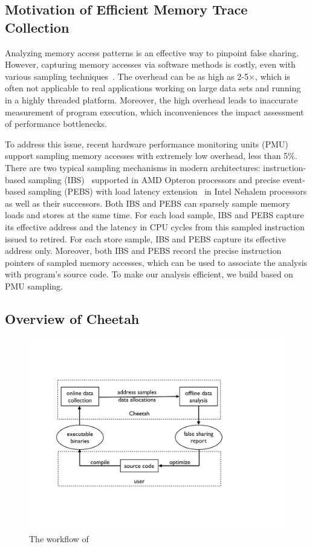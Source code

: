 \sloppy
\subsection{Motivation of Efficient Memory Trace Collection}
Analyzing memory access patterns is an effective way to pinpoint false sharing. However, capturing memory accesses via software methods is costly, even with various sampling techniques~\cite{macpo,SLO2}. The overhead can be as high as 2-5$\times$, which is often not applicable to real applications working on large data sets and running in a highly threaded platform. Moreover, the high overhead leads to inaccurate measurement of program execution, which inconveniences the impact assessment of performance bottlenecks.

To address this issue, recent hardware performance monitoring units (PMU) support sampling memory accesses with extremely low overhead, less than 5\%. There are two typical sampling mechanisms in modern architectures: instruction-based sampling (IBS)~\cite{AMDIBS:07} supported in AMD Opteron processors and precise event-based sampling (PEBS) with load latency extension~\cite{IntelArch:PEBS:Sept09} in Intel Nehalem processors as well as their successors. Both IBS and PEBS can sparsely sample memory loads and stores at the same time. For each load sample, IBS and PEBS capture its effective address and the latency in CPU cycles from this sampled instruction issued to retired. For each store sample, IBS and PEBS capture its effective address only. Moreover, both IBS and PEBS record the precise instruction pointers of sampled memory accesses, which can be used to associate the analysis with program's source code. To make our analysis efficient, we build \Cheetah{} based on PMU sampling. 

 \subsection{Overview of Cheetah}

\begin{figure}[htbp]
\centering
\includegraphics[width=\columnwidth]{figure/workflow}
\caption{The workflow of \cheetah{}}
\label{fig:workflow}
\end{figure}

